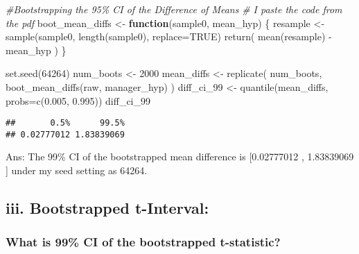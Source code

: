 \documentclass[
]{article}
\newenvironment{Shaded}{\begin{snugshade}}{\end{snugshade}}
\newcommand{\AttributeTok}[1]{\textcolor[rgb]{0.77,0.63,0.00}{#1}}
\newcommand{\CommentTok}[1]{\textcolor[rgb]{0.56,0.35,0.01}{\textit{#1}}}
\newcommand{\ConstantTok}[1]{\textcolor[rgb]{0.00,0.00,0.00}{#1}}
\newcommand{\ControlFlowTok}[1]{\textcolor[rgb]{0.13,0.29,0.53}{\textbf{#1}}}
\newcommand{\DecValTok}[1]{\textcolor[rgb]{0.00,0.00,0.81}{#1}}
\newcommand{\FloatTok}[1]{\textcolor[rgb]{0.00,0.00,0.81}{#1}}
\newcommand{\FunctionTok}[1]{\textcolor[rgb]{0.00,0.00,0.00}{#1}}
\newcommand{\NormalTok}[1]{#1}
\newcommand{\OtherTok}[1]{\textcolor[rgb]{0.56,0.35,0.01}{#1}}
\newcommand{\SpecialCharTok}[1]{\textcolor[rgb]{0.00,0.00,0.00}{#1}}
\begin{document}
\begin{Shaded}
\begin{Highlighting}[]
\CommentTok{\#Bootstrapping the 95\% CI of the Difference of Means}
\CommentTok{\# I paste the code from the pdf}
\NormalTok{boot\_mean\_diffs }\OtherTok{\textless{}{-}} \ControlFlowTok{function}\NormalTok{(sample0, mean\_hyp) \{}
\NormalTok{resample }\OtherTok{\textless{}{-}} \FunctionTok{sample}\NormalTok{(sample0, }\FunctionTok{length}\NormalTok{(sample0), }\AttributeTok{replace=}\ConstantTok{TRUE}\NormalTok{)}
\FunctionTok{return}\NormalTok{( }\FunctionTok{mean}\NormalTok{(resample) }\SpecialCharTok{{-}}\NormalTok{ mean\_hyp )}
\NormalTok{\}}

\FunctionTok{set.seed}\NormalTok{(}\DecValTok{64264}\NormalTok{)}
\NormalTok{num\_boots }\OtherTok{\textless{}{-}} \DecValTok{2000}
\NormalTok{mean\_diffs }\OtherTok{\textless{}{-}} \FunctionTok{replicate}\NormalTok{(}
\NormalTok{num\_boots,}
\FunctionTok{boot\_mean\_diffs}\NormalTok{(raw, manager\_hyp)}
\NormalTok{)}
\NormalTok{diff\_ci\_99 }\OtherTok{\textless{}{-}} \FunctionTok{quantile}\NormalTok{(mean\_diffs, }\AttributeTok{probs=}\FunctionTok{c}\NormalTok{(}\FloatTok{0.005}\NormalTok{, }\FloatTok{0.995}\NormalTok{))}
\NormalTok{diff\_ci\_99}
\end{Highlighting}
\end{Shaded}

\begin{verbatim}
##       0.5%      99.5% 
## 0.02777012 1.83839069
\end{verbatim}

Ans: The 99\% CI of the bootstrapped mean difference is {[}0.02777012 ,
1.83839069 {]} under my seed setting as 64264.

\hypertarget{iii.-bootstrapped-t-interval}{%
\subsection{iii. Bootstrapped
t-Interval:}\label{iii.-bootstrapped-t-interval}}

\hypertarget{what-is-99-ci-of-the-bootstrapped-t-statistic}{%
\subsubsection{What is 99\% CI of the bootstrapped
t-statistic?}\label{what-is-99-ci-of-the-bootstrapped-t-statistic}}
\end{document}
